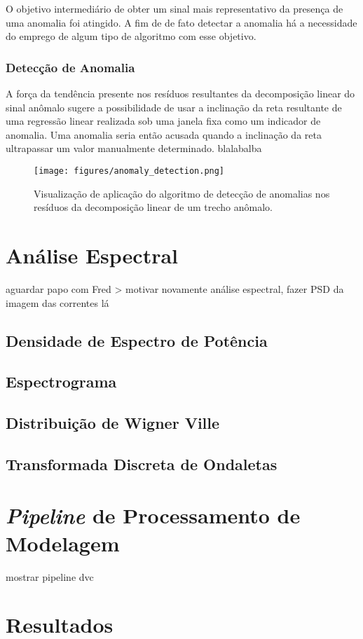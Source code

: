 O objetivo intermediário de obter um sinal mais representativo da presença de
uma anomalia foi atingido. A fim de de fato detectar a anomalia há a
necessidade do emprego de algum tipo de algoritmo com esse objetivo.

\subsubsection{Detecção de Anomalia}

A força da tendência presente nos resíduos resultantes da decomposição linear
do sinal anômalo sugere a possibilidade de usar a inclinação da reta
resultante de uma regressão linear realizada sob uma janela fixa como um
indicador de anomalia. Uma anomalia seria então acusada quando a inclinação
da reta ultrapassar um valor manualmente determinado. blalabalba

\begin{figure}[H]
    \centering
    \texttt{[image: figures/anomaly\_detection.png]}
    \caption{Visualização de aplicação do algoritmo de detecção de anomalias
    nos resíduos da decomposição linear de um trecho anômalo.}
    \label{fig:normal_residue}
\end{figure}


\section{Análise Espectral}

aguardar papo com Fred
> motivar novamente análise espectral, fazer PSD da imagem das correntes lá

\subsection{Densidade de Espectro de Potência}

\subsection{Espectrograma}

\subsection{Distribuição de Wigner Ville}

\subsection{Transformada Discreta de Ondaletas}

\section{\emph{Pipeline} de Processamento de Modelagem}

mostrar pipeline dvc%

\section{Resultados}

